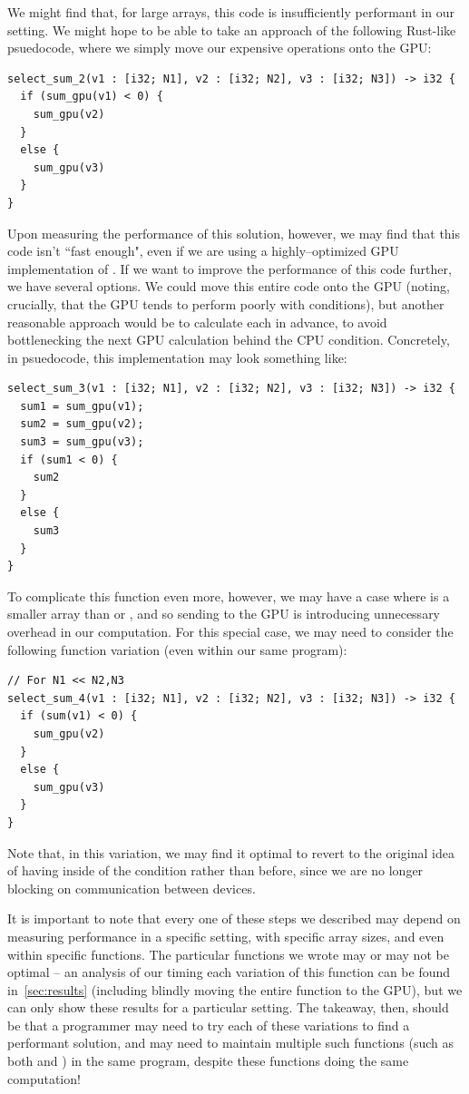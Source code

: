 We might find that, for large arrays, this code is insufficiently performant in our setting. We might hope to be able to take an approach of the following Rust-like psuedocode, where we simply move our expensive  operations onto the GPU:
%
\begin{lstlisting}
select_sum_2(v1 : [i32; N1], v2 : [i32; N2], v3 : [i32; N3]) -> i32 {
  if (sum_gpu(v1) < 0) {
    sum_gpu(v2)
  }
  else {
    sum_gpu(v3)
  }
}
\end{lstlisting}
%
Upon measuring the performance of this solution, however, we may find that this code isn't ``fast enough", even if we are using a highly--optimized GPU implementation of .  If we want to improve the performance of this code further, we have several options.  We could move this entire code onto the GPU (noting, crucially, that the GPU tends to perform poorly with conditions), but another reasonable approach would be to calculate each  in advance, to avoid bottlenecking the next GPU calculation behind the CPU condition.  Concretely, in psuedocode, this implementation may look something like:
%
\begin{lstlisting}
select_sum_3(v1 : [i32; N1], v2 : [i32; N2], v3 : [i32; N3]) -> i32 {
  sum1 = sum_gpu(v1);
  sum2 = sum_gpu(v2);
  sum3 = sum_gpu(v3);
  if (sum1 < 0) {
    sum2
  }
  else {
    sum3
  }
}
\end{lstlisting}
%
To complicate this function even more, however, we may have a case where  is a smaller array than  or , and so sending  to the GPU is introducing unnecessary overhead in our computation.  For this special case, we may need to consider the following function variation (even within our same program):
%
\begin{lstlisting}
// For N1 << N2,N3
select_sum_4(v1 : [i32; N1], v2 : [i32; N2], v3 : [i32; N3]) -> i32 {
  if (sum(v1) < 0) {
    sum_gpu(v2)
  }
  else {
    sum_gpu(v3)
  }
}
\end{lstlisting}
%
Note that, in this variation, we may find it optimal to revert to the original idea of having  inside of the condition rather than before, since we are no longer blocking on communication between devices.

It is important to note that every one of these steps we described may depend on measuring performance in a specific setting, with specific array sizes, and even within specific functions.  The particular functions we wrote may or may not be optimal -- an analysis of our timing each variation of this function can be found in~\ref{sec:results} (including blindly moving the entire  function to the GPU), but we can only show these results for a particular setting.  The takeaway, then, should be that a programmer may need to try each of these variations to find a performant solution, and may need to maintain multiple such functions (such as both  and ) in the same program, despite these functions doing the same computation!

